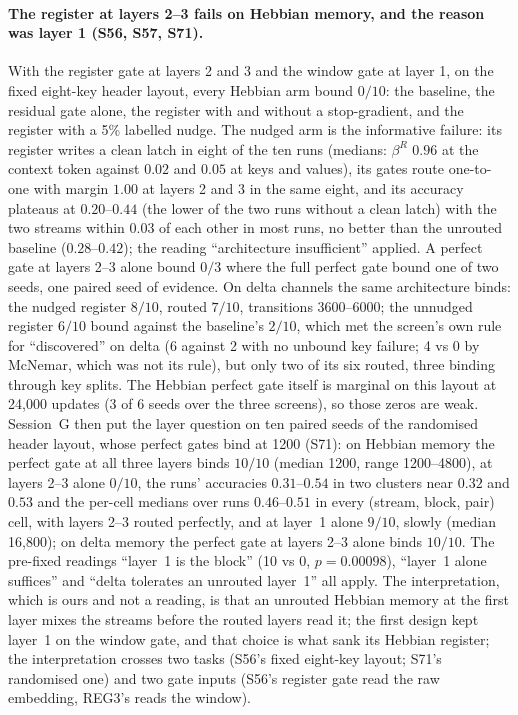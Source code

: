 \documentclass[11pt]{article}
\begin{document}
\paragraph{The register at layers 2--3 fails on Hebbian memory, and the reason was layer 1 (S56, S57, S71).} With the register gate at layers 2 and 3 and the window gate at layer 1, on the fixed eight-key header layout, every Hebbian arm bound $0/10$: the baseline, the residual gate alone, the register with and without a stop-gradient, and the register with a 5\% labelled nudge. The nudged arm is the informative failure: its register writes a clean latch in eight of the ten runs (medians: $\beta^R$ $0.96$ at the context token against $0.02$ and $0.05$ at keys and values), its gates route one-to-one with margin $1.00$ at layers 2 and 3 in the same eight, and its accuracy plateaus at $0.20$--$0.44$ (the lower of the two runs without a clean latch) with the two streams within $0.03$ of each other in most runs, no better than the unrouted baseline ($0.28$--$0.42$); the reading ``architecture insufficient'' applied. A perfect gate at layers 2--3 alone bound $0/3$ where the full perfect gate bound one of two seeds, one paired seed of evidence. On delta channels the same architecture binds: the nudged register $8/10$, routed $7/10$, transitions 3600--6000; the unnudged register $6/10$ bound against the baseline's $2/10$, which met the screen's own rule for ``discovered'' on delta (6 against 2 with no unbound key failure; 4 vs 0 by McNemar, which was not its rule), but only two of its six routed, three binding through key splits. The Hebbian perfect gate itself is marginal on this layout at 24{,}000 updates (3 of 6 seeds over the three screens), so those zeros are weak. Session~G then put the layer question on ten paired seeds of the randomised header layout, whose perfect gates bind at 1200 (S71): on Hebbian memory the perfect gate at all three layers binds $10/10$ (median 1200, range 1200--4800), at layers 2--3 alone $0/10$, the runs' accuracies $0.31$--$0.54$ in two clusters near $0.32$ and $0.53$ and the per-cell medians over runs $0.46$--$0.51$ in every (stream, block, pair) cell, with layers 2--3 routed perfectly, and at layer~1 alone $9/10$, slowly (median 16{,}800); on delta memory the perfect gate at layers 2--3 alone binds $10/10$. The pre-fixed readings ``layer~1 is the block'' (10 vs 0, $p = 0.00098$), ``layer~1 alone suffices'' and ``delta tolerates an unrouted layer~1'' all apply. The interpretation, which is ours and not a reading, is that an unrouted Hebbian memory at the first layer mixes the streams before the routed layers read it; the first design kept layer~1 on the window gate, and that choice is what sank its Hebbian register; the interpretation crosses two tasks (S56's fixed eight-key layout; S71's randomised one) and two gate inputs (S56's register gate read the raw embedding, REG3's reads the window).
\end{document}
